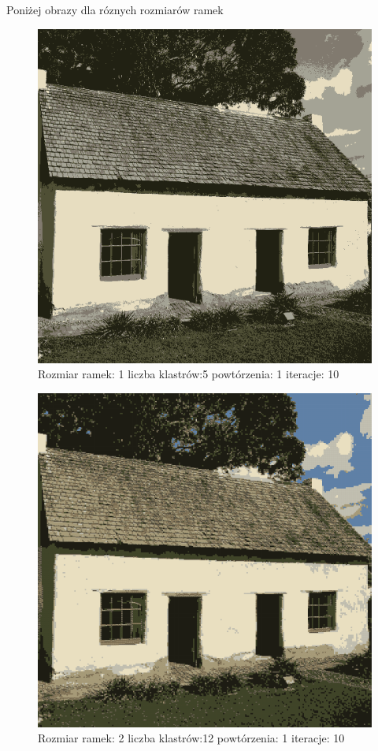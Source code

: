 \documentclass{classrep}
\begin{document}
{{{{Poniżej obrazy dla róznych rozmiarów ramek
\begin{figure}[!htbp]
\centering
\includegraphics[width=\textwidth,width=90mm]{obrazy/house_R1_K5_P1_It10.png}
\caption{Rozmiar ramek: 1 liczba klastrów:5 powtórzenia: 1 iteracje: 10 }
\end{figure}

\begin{figure}[!htbp]
\centering
\includegraphics[width=\textwidth,width=90mm]{obrazy/house_R2_K12_P1_It10.png}
\caption{Rozmiar ramek: 2 liczba klastrów:12 powtórzenia: 1 iteracje: 10 }
\end{figure}

}}}}
\end{document}

